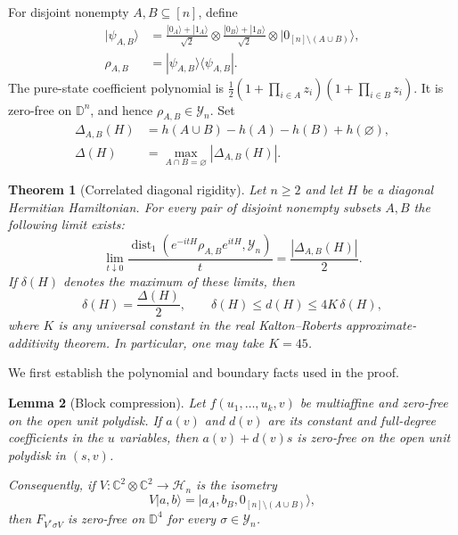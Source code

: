 \documentclass[reqno]{amsart}
\newtheorem{theorem}{Theorem}[section]
\newtheorem{lemma}[theorem]{Lemma}
\theoremstyle{definition}
\theoremstyle{remark}
\newcommand{\C}{\mathbb C}
\newcommand{\D}{\mathbb D}
\begin{document}
For disjoint nonempty $A,B\subseteq[n]$, define
\begin{equation}
\begin{aligned}
 |\psi_{A,B}\rangle
 &=\frac{|0_A\rangle+|1_A\rangle}{\sqrt2}
  \otimes\frac{|0_B\rangle+|1_B\rangle}{\sqrt2}
  \otimes|0_{[n]\setminus(A\cup B)}\rangle,\\
 \rho_{A,B}&=|\psi_{A,B}\rangle\langle\psi_{A,B}|.
\end{aligned}
 \label{rob:ghz-probe}
\end{equation}
The pure-state coefficient polynomial is
$\frac12(1+\prod_{i\in A}z_i)(1+\prod_{i\in B}z_i)$.
It is zero-free on $\D^n$, and hence $\rho_{A,B}\in\mathcal Y_n$.
Set
\begin{align*}
 \Delta_{A,B}(H)&=h(A\cup B)-h(A)-h(B)+h(\varnothing),\\
 \Delta(H)&=\max_{A\cap B=\varnothing}|\Delta_{A,B}(H)|.
\end{align*}

\begin{theorem}[Correlated diagonal rigidity]
\label{rob:diagonal}
Let $n\geq2$ and let $H$ be a diagonal Hermitian Hamiltonian.  For every
pair of disjoint nonempty subsets $A,B$ the following limit exists:
\begin{equation}
 \lim_{t\downarrow0}
 \frac{\operatorname{dist}_1
       (e^{-itH}\rho_{A,B}e^{itH},\mathcal Y_n)}{t}
 =\frac{|\Delta_{A,B}(H)|}{2}.
 \label{rob:exact-defect}
\end{equation}
If $\delta(H)$ denotes the maximum of these limits, then
\begin{equation}
 \delta(H)=\frac{\Delta(H)}2,
 \qquad
 \delta(H)\leq d(H)\leq4K\,\delta(H),
 \label{rob:diagonal-bounds}
\end{equation}
where $K$ is any universal constant in the real Kalton--Roberts
approximate-additivity theorem.  In particular, one may take $K=45$.
\end{theorem}

We first establish the polynomial and boundary facts used in the proof.

\begin{lemma}[Block compression]
\label{rob:compression}
Let $f(u_1,\ldots,u_k,v)$ be multiaffine and zero-free on the open unit
polydisk.  If $a(v)$ and $d(v)$ are its constant and full-degree
coefficients in the $u$ variables, then $a(v)+d(v)s$ is zero-free on
the open unit polydisk in $(s,v)$.

Consequently, if
$V:\C^2\otimes\C^2\longrightarrow\mathcal H_n$ is the isometry
\[
 V|a,b\rangle=|a_A,b_B,0_{[n]\setminus(A\cup B)}\rangle,
\]
then $F_{V^*\sigma V}$ is zero-free on $\D^4$ for every
$\sigma\in\mathcal Y_n$.
\end{lemma}
\end{document}

